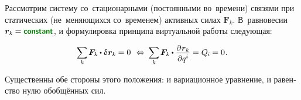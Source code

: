 \label{section:statics}

\begin{otherlanguage}{russian}

Рассмотрим систему со~стационарными (постоянными во~времени) связями при статических (не~меняющихся со~временем) активных силах ${\bm{F}_k}$.
В~равновесии ${\locationvector_k \hspace{-0.12ex} = \boldconstant}$, и формулировка принципа виртуальной работы следующая:

\nopagebreak\vspace{-0.1em}\begin{equation}\label{statics.discrete:principleofvirtualwork}
\scalebox{0.92}[0.96]{$ \displaystyle \sum_{\smash{k}} $} \hspace{.25ex}
\bm{F}_k \hspace{-0.1ex} \dotp \variation{\hspace{.1ex}\locationvector_k} \hspace{-0.1ex} = 0
\:\,\Leftrightarrow\:
\scalebox{0.92}[0.96]{$ \displaystyle \sum_{\smash{k}} $} \hspace{.25ex}
\bm{F}_k \hspace{-0.1ex} \dotp \scalebox{0.96}{$ \displaystyle \frac{\raisemath{-0.12em}{\partial \hspace{.1ex} \locationvector_k}}{\raisemath{-0.1em}{\partial q^i}} $}
= Q_{\hspace{-0.1ex}i} \hspace{-0.1ex} = 0 \hspace{.1ex} .
\vspace{-0.1em}\end{equation}

\vspace{-0.15em}\noindent
Существенны обе стороны этого положения: и вариационное уравнение, и равенство нулю обобщённых сил.


\end{otherlanguage}
